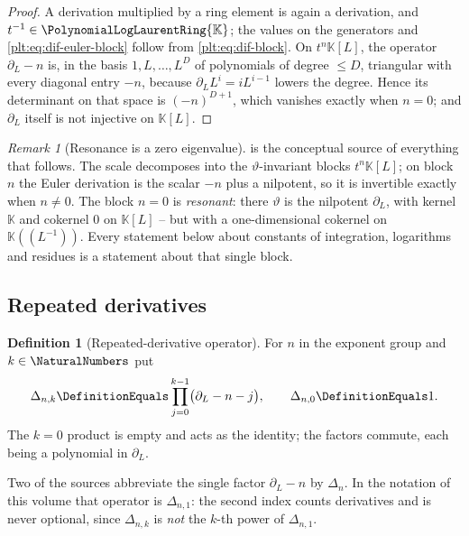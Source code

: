 \documentclass[11pt,oneside]{article}
\theoremstyle{plain}
\theoremstyle{definition}
\newtheorem{definition}[theorem]{Definition}
\theoremstyle{remark}
\newtheorem{remark}[theorem]{Remark}
\newcommand{\K}{\mathbb{K}}
\newcommand{\PLlau}{\PolynomialLogLaurentRing{\K}}       %
\newcommand{\EulerOp}{\vartheta}                         %
\newcommand{\shiftop}[2]{\Delta_{#1,#2}}                 %
\begin{document}
\begin{proof}
A derivation multiplied by a ring element is again a derivation, and
\(t^{-1}\in\PLlau\); the values on the generators and
\cref{plt:eq:dif-euler-block} follow from \cref{plt:eq:dif-block}.  On
\(t^{n}\K[L]\), the operator \(\partial_{L}-n\) is, in the basis
\(1,L,\dots,L^{D}\) of polynomials of degree \(\le D\), triangular with every
diagonal entry \(-n\), because \(\partial_{L}L^{i}=iL^{i-1}\) lowers the degree.
Hence its determinant on that space is \((-n)^{D+1}\), which vanishes exactly
when \(n=0\); and \(\partial_{L}\) itself is not injective on \(\K[L]\).
\end{proof}

\begin{remark}[Resonance is a zero eigenvalue]\label{plt:rmk:dif-resonance}
 is the conceptual source of everything that follows.
The scale decomposes into the \(\EulerOp\)-invariant blocks \(t^{n}\K[L]\); on
block \(n\) the Euler derivation is the scalar \(-n\) plus a nilpotent, so it
is invertible exactly when \(n\ne0\).  The block \(n=0\) is \emph{resonant}:
there \(\EulerOp\) is the nilpotent \(\partial_{L}\), with kernel \(\K\) and
cokernel \(0\) on \(\K[L]\) -- but with a one-dimensional cokernel on
\(\K((L^{-1}))\).  Every statement below about constants of integration,
logarithms and residues is a statement about that single block.
\end{remark}

\subsection{Repeated derivatives}
\label{plt:sec:dif-repeated}

\begin{definition}[Repeated-derivative operator]\label{plt:def:dif-shiftop}
For \(n\) in the exponent group and \(k\in\NaturalNumbers\) put
\begin{equation}\label{plt:eq:dif-shiftop}
  \shiftop{n}{k}\DefinitionEquals\prod_{j=0}^{k-1}
  \bigl(\partial_{L}-n-j\bigr),
  \qquad \shiftop{n}{0}\DefinitionEquals1 .
\end{equation}
The \(k=0\) product is empty and acts as the identity; the factors commute,
each being a polynomial in \(\partial_{L}\).
\end{definition}

Two of the sources abbreviate the single factor \(\partial_{L}-n\) by
\(\Delta_{n}\).  In the notation of this volume that operator is
\(\shiftop{n}{1}\): the second index counts derivatives and is never optional,
since \(\shiftop{n}{k}\) is \emph{not} the \(k\)-th power of
\(\shiftop{n}{1}\).
\end{document}
